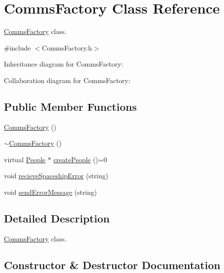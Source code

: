 \hypertarget{classCommsFactory}{}\section{Comms\+Factory Class Reference}
\label{classCommsFactory}


\hyperlink{classCommsFactory}{Comms\+Factory} class.  




{\ttfamily \#include $<$Comms\+Factory.\+h$>$}



Inheritance diagram for Comms\+Factory\+:


Collaboration diagram for Comms\+Factory\+:
\subsection*{Public Member Functions}
\begin{DoxyCompactItemize}
\item 
\hyperlink{classCommsFactory_aa07ffd7bffb6002195c8a2c18fa344be}{Comms\+Factory} ()
\item 
\hyperlink{classCommsFactory_ac5f4f8909ae9fd5d86ac41812227bdef}{$\sim$\+Comms\+Factory} ()
\item 
virtual \hyperlink{classPeople}{People} $\ast$ \hyperlink{classCommsFactory_a91017f5bf12f0e8166c4be9efe9efa11}{create\+People} ()=0
\item 
void \hyperlink{classCommsFactory_ae0c2cf49336ef7346944970f0a1661d2}{recieve\+Spaceship\+Error} (string)
\item 
void \hyperlink{classCommsFactory_a5f565ce3e7a75ab2f40dece51adda485}{send\+Error\+Message} (string)
\end{DoxyCompactItemize}


\subsection{Detailed Description}
\hyperlink{classCommsFactory}{Comms\+Factory} class. 

\subsection{Constructor \& Destructor Documentation}
\mbox{\label{classCommsFactory_aa07ffd7bffb6002195c8a2c18fa344be}} 
